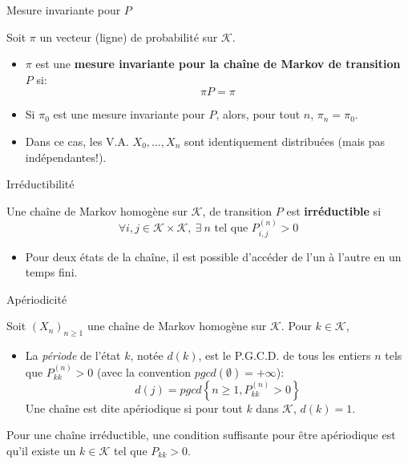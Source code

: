 \documentclass[9pt,ignorenonframetext,]{beamer}
\providecommand{\tightlist}{%
  \setlength{\itemsep}{0pt}\setlength{\parskip}{0pt}}
\newcommand{\K}{\mathcal{K}}
\begin{document}
\begin{frame}{Mesure invariante pour \(P\)}
\protect\hypertarget{mesure-invariante-pour-p}{}

Soit \(\pi\) un vecteur (ligne) de probabilité sur \(\K\).

\begin{itemize}
\item
  \(\pi\) est une \textbf{mesure invariante pour la chaîne de Markov de
  transition \(P\)} si: \[\pi P = \pi\] \pause
\item
  Si \(\pi_0\) est une mesure invariante pour \(P\), alors, pour tout
  \(n\), \(\pi_n = \pi_0\).
\item
  Dans ce cas, les V.A. \(X_0,\dots, X_n\) sont identiquement
  distribuées (mais pas indépendantes!).
\end{itemize}

\end{frame}

\begin{frame}{Irréductibilité}
\protect\hypertarget{irruxe9ductibilituxe9}{}

Une chaîne de Markov homogène sur \(\K\), de transition \(P\) est
\textbf{irréductible} si
\[\forall i,j \in \K\times \K,~\exists~n \text{ tel que } P^{(n)}_{i,j} > 0\]

\begin{itemize}
\tightlist
\item
  Pour deux états de la chaîne, il est possible d'accéder de l'un à
  l'autre en un temps fini.
\end{itemize}

\end{frame}

\begin{frame}{Apériodicité}
\protect\hypertarget{apuxe9riodicituxe9}{}

Soit \((X_n)_{n\geq 1}\) une chaîne de Markov homogène sur \(\K\). Pour
\(k \in \K\),

\begin{itemize}
\tightlist
\item
  La \emph{période} de l'état \(k\), notée \(d(k)\), est le P.G.C.D. de
  tous les entiers \(n\) tels que \(P^{(n)}_{kk} > 0\) (avec la
  convention \(pgcd(\emptyset) = +\infty\)):
  \[d(j) = pgcd\left\lbrace n\geq 1, P^{(n)}_{kk} > 0\right\rbrace\] Une
  chaîne est dite apériodique si pour tout \(k\) dans \(\K\),
  \(d(k) = 1\). \pause 
\end{itemize}

Pour une chaîne irréductible, une condition suffisante pour être
apériodique est qu'il existe un \(k\in \K\) tel que \(P_{kk} > 0\).

\end{frame}
\end{document}

